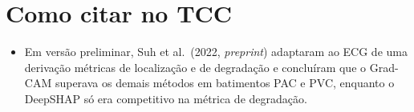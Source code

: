 \documentclass[11pt,a4paper]{article}
\begin{document}
\section{Como citar no TCC}
\begin{itemize}
  \item Em versão preliminar, Suh et al.\ (2022, \textit{preprint}) adaptaram ao ECG de uma derivação métricas de localização e de degradação e concluíram que o Grad-CAM superava os demais métodos em batimentos PAC e PVC, enquanto o DeepSHAP só era competitivo na métrica de degradação.
\end{itemize}
\end{document}
